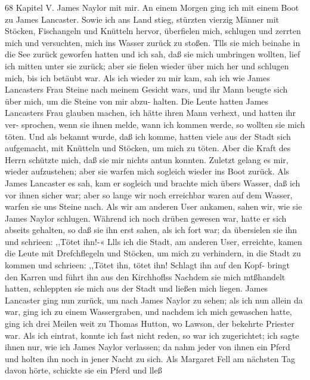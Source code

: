 68 Kapitel V.
James Naylor mit mir. An einem Morgen ging ich mit einem
Boot zu James Lancaster. Sowie ich ans Land stieg, stürzten vierzig
Männer mit Stöcken, Fischangeln und Knütteln hervor, überfielen
mich, schlugen und zerrten mich und versuchten, mich ins Wasser zurück
zu stoßen. Tlls sie mich beinahe in die See zurück geworfen hatten
und ich sah, daß sie mich umbringen wollten, lief ich mitten unter sie
zurück; aber sie fielen wieder über mich her und schlugen mich,
bis ich betäubt war. Als ich wieder zu mir kam, sah ich wie
James Lancasters Frau Steine nach meinem Gesicht wars, und
ihr Mann beugte sich über mich, um die Steine von mir abzu-
halten. Die Leute hatten James Lancasters Frau glauben
machen, ich hätte ihren Mann verhext, und hatten ihr ver-
sprochen, wenn sie ihnen melde, wann ich kommen werde, so
wollten sie mich töten. Und als bekannt wurde, daß ich komme,
hatten viele aus der Stadt sich aufgemacht, mit Knütteln und
Stöcken, um mich zu töten. Aber die Kraft des Herrn
schützte mich, daß sie mir nichts antun konnten. Zuletzt gelang
es mir, wieder aufzustehen; aber sie warfen mich sogleich wieder
ins Boot zurück. Als James Lancaster es sah, kam er sogleich
und brachte mich übers Wasser, daß ich vor ihnen sicher war;
aber so lange wir noch erreichbar waren auf dem Wasser, warfen
sie uns Steine nach. Als wir am anderen User ankamen, sahen
wir, wie sie James Naylor schlugen. Während ich noch drüben
gewesen war, hatte er sich abseits gehalten, so daß sie ihn erst sahen,
als ich fort war; da übersielen sie ihn und schrieen: ,,Tötet ihn!-«
Llls ich die Stadt, am anderen User, erreichte, kamen die
Leute mit Drefchflegeln und Stöcken, um mich zu verhindern, in
die Stadt zu kommen und schrieen: ,,Tötet ihn, tötet ihn! Schlagt
ihn auf den Kopf- bringt den Karren und führt ihn aus den
Kirchhoflss Nachdem sie mich mtßhandelt hatten, schleppten sie
mich aus der Stadt und ließen mich liegen. James Lancaster
ging nun zurück, um nach James Naylor zu sehen; als ich nun
allein da war, ging ich zu einem Wassergraben, und nachdem ich
mich gewaschen hatte, ging ich drei Meilen weit zu Thomas
Hutton, wo Lawson, der bekehrte Priester war. Als ich eintrat,
konnte ich fast nicht reden, so war ich zugerichtet; ich sagte ihnen nur,
wie ich James Naylor verlassen; da nahm jeder von ihnen ein
Pferd und holten ihn noch in jener Nacht zu sich. Als Margaret
Fell am nächsten Tag davon hörte, schickte sie ein Pferd und lleß



